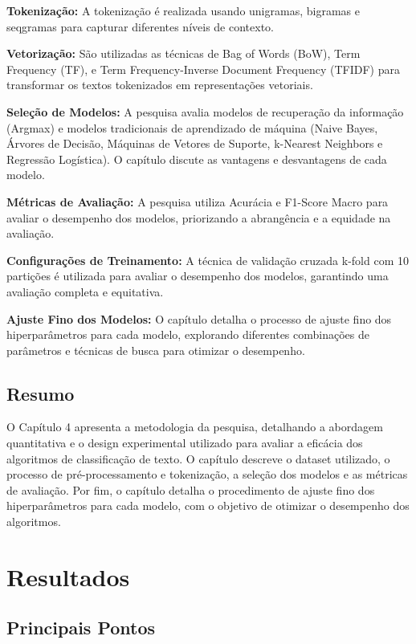 \documentclass{report}
\begin{document}
\textbf{Tokenização:} A tokenização é realizada usando unigramas, bigramas e seqgramas para capturar diferentes níveis de contexto.

\textbf{Vetorização:} São utilizadas as técnicas de Bag of Words (BoW), Term Frequency (TF), e Term Frequency-Inverse Document Frequency (TFIDF) para transformar os textos tokenizados em representações vetoriais.

\textbf{Seleção de Modelos:} A pesquisa avalia modelos de recuperação da informação (Argmax) e modelos tradicionais de aprendizado de máquina (Naive Bayes, Árvores de Decisão, Máquinas de Vetores de Suporte, k-Nearest Neighbors e Regressão Logística). O capítulo discute as vantagens e desvantagens de cada modelo.

\textbf{Métricas de Avaliação:} A pesquisa utiliza Acurácia e F1-Score Macro para avaliar o desempenho dos modelos, priorizando a abrangência e a equidade na avaliação.

\textbf{Configurações de Treinamento:} A técnica de validação cruzada k-fold com 10 partições é utilizada para avaliar o desempenho dos modelos, garantindo uma avaliação completa e equitativa.

\textbf{Ajuste Fino dos Modelos:} O capítulo detalha o processo de ajuste fino dos hiperparâmetros para cada modelo, explorando diferentes combinações de parâmetros e técnicas de busca para otimizar o desempenho.

\section*{Resumo}

O Capítulo 4 apresenta a metodologia da pesquisa, detalhando a abordagem quantitativa e o design experimental utilizado para avaliar a eficácia dos algoritmos de classificação de texto. O capítulo descreve o dataset utilizado, o processo de pré-processamento e tokenização, a seleção dos modelos e as métricas de avaliação. Por fim, o capítulo detalha o procedimento de ajuste fino dos hiperparâmetros para cada modelo, com o objetivo de otimizar o desempenho dos algoritmos.

\chapter{Resultados}

\section*{Principais Pontos}
\end{document}
